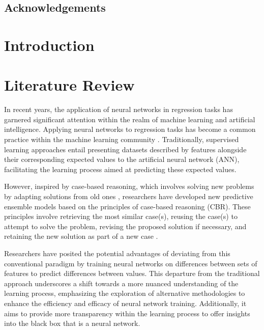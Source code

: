\documentclass[a4paper, 12pt]{report}
\begin{document}
\section{Acknowledgements}


\tableofcontents

\listoffigures

\listoftables

\chapter{Introduction}
\label{ch:introduction}


\chapter{Literature Review}
\label{ch:Literature Review}
In recent years, the application of neural networks in regression tasks has garnered significant attention within the realm of machine learning and artificial intelligence. 
Applying neural networks to regression tasks has become a common practice within the machine learning community \cite{neuralNetForRegression}. 
Traditionally, supervised learning approaches entail presenting datasets described by features alongside their corresponding expected values to the artificial neural network (ANN), 
facilitating the learning process aimed at predicting these expected values.

However, inspired by case-based reasoning, which involves solving new problems by adapting solutions from old ones \cite{riesbeck2013inside}, 
researchers have developed new predictive ensemble models based on the principles of case-based reasoning (CBR). 
These principles involve retrieving the most similar case(s), reusing the case(s) to attempt to solve the problem,
revising the proposed solution if necessary, and retaining the new solution as part of a new case \cite{watsonCaseBasedReasoningReview}.

Researchers have posited the potential advantages of deviating from this conventional paradigm by 
training neural networks on differences between sets of features to predict differences between values. 
This departure from the traditional approach underscores a shift towards a more nuanced understanding of the learning process, 
emphasizing the exploration of alternative methodologies to enhance the efficiency and efficacy of neural network training. 
Additionally, it aims to provide more transparency within the learning process to offer insights into the black box that is a neural network.
\end{document}
